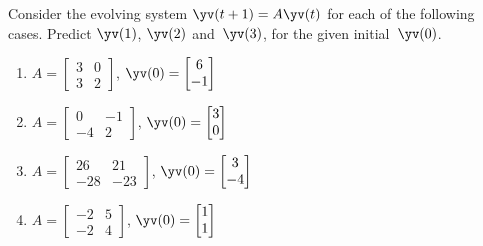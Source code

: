 \begin{exercise} \label{ex:yay} 
Consider the evolving system \(\yv(t+1)=A\yv(t)\) for each of the following cases. 
Predict \(\yv(1)\), \(\yv(2)\) and~\(\yv(3)\), for the given initial~\(\yv(0)\).
\begin{enumerate}
\item \(A=\begin{bmatrix} 3 & 0
\\3 & 2 \end{bmatrix}\), 
\(\yv(0)=\begin{bmatrix} 6
\\-1 \end{bmatrix}\)

\item \(A=\begin{bmatrix} 0 & -1
\\-4 & 2 \end{bmatrix}\), 
\(\yv(0)=\begin{bmatrix} 3
\\0 \end{bmatrix}\)

\item \(A=\begin{bmatrix} 26 & 21
\\-28 & -23 \end{bmatrix}\), 
\(\yv(0)=\begin{bmatrix} 3
\\-4 \end{bmatrix}\)

\item \(A=\begin{bmatrix} -2 & 5
\\-2 & 4 \end{bmatrix}\), 
\(\yv(0)=\begin{bmatrix} 1
\\1 \end{bmatrix}\)


\end{enumerate}
\end{exercise}
